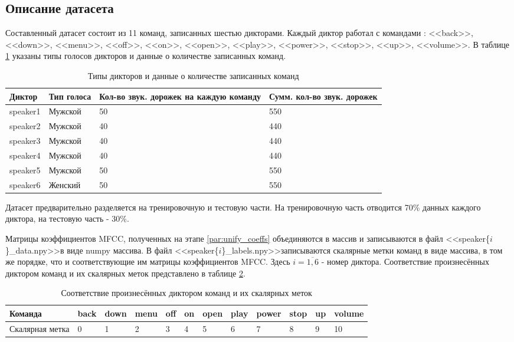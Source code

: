 \subsection{Описание датасета}
Составленный датасет состоит из 11 команд, записанных шестью дикторами. Каждый диктор работал с командами : <<back>>, <<down>>, <<menu>>, <<off>>, <<on>>, <<open>>, <<play>>, <<power>>, <<stop>>, <<up>>, <<volume>>. В таблице \ref{table:dataset} указаны типы голосов дикторов и данные о количестве записанных команд.
\begin{table}[H]
\begin{tabular}[c]{ | p{1.8cm} | p{2.5cm} | p{6cm} | p{4cm} | }
	\hline
	Диктор & Тип голоса & Кол-во звук. дорожек на каждую команду & Сумм. кол-во звук. дорожек  \\ \hline
	speaker1 & Мужской & 50 & 550 \\
	speaker2 & Мужской & 40 & 440 \\
	speaker3 & Мужской & 40 & 440 \\
	speaker4 & Мужской & 40 & 440 \\
	speaker5 & Мужской & 50 & 550 \\
	speaker6 & Женский & 50 & 550 \\ \hline
	
\end{tabular}
\caption{\label{table:dataset}Типы дикторов и данные о количестве записанных команд}
\end{table}

Датасет предварительно разделяется на тренировочную и тестовую части. На тренировочную часть отводится 70\% данных каждого диктора, на тестовую часть - 30\%.

\label{par:saving_preprocessed_data}
Матрицы коэффициентов MFCC, полученных на этапе \ref{par:unify_coeffs} объединяются в массив и записываются в файл <<speaker\{$i$\}\_data.npy>>\footnotemark[\value{footnote}] \space в виде numpy массива. В файл <<speaker\{$i$\}\_labels.npy>>\footnotemark[\value{footnote}] записываются скалярные метки команд в виде массива, в том же порядке, что и соответствующие им матрицы коэффициентов MFCC. Здесь $i=\overline{1,6}$  - номер диктора. Соответствие произнесённых диктором команд и их скалярных меток представлено в таблице \ref{table:commands}.


\begin{table}[H]
	\small
	\begin{tabular}[c]{ | l | l | l | l | l | l | l | l | l | l | l | l |}
		\hline
		Команда	 &  back & down & menu & off & on & open & play & power & stop & up & volume \\ \hline
		Скалярная метка & 0 & 1 & 2 & 3 & 4 & 5 & 6 & 7 & 8 & 9 & 10 \\ \hline
		
	\end{tabular}
	\caption{\label{table:commands}Соответствие произнесённых диктором команд и их скалярных меток}
\end{table}